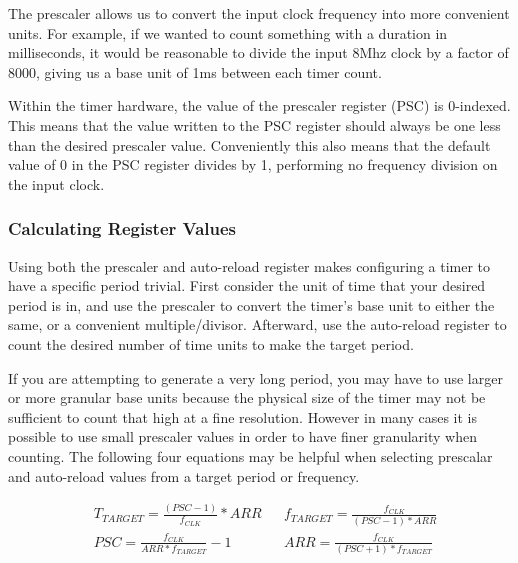 \documentclass[11pt,fleqn]{book} %
\begin{document}
        The prescaler allows us to convert the input clock frequency into more convenient units. For example, if we wanted to count something with a duration in milliseconds, it would be reasonable to divide the input 8Mhz clock by a factor of 8000, giving us a base unit of 1ms between each timer count. 
        
        Within the timer hardware, the value of the prescaler register (PSC) is 0-indexed. This means that the value written to the PSC register should always be one less than the desired prescaler value. Conveniently this also means that the default value of 0 in the PSC register divides by 1, performing no frequency division on the input clock. 

    \subsubsection{Calculating Register Values}
        Using both the prescaler and auto-reload register makes configuring a timer to have a specific period trivial. First consider the unit of time that your desired period is in, and use the prescaler to convert the timer's base unit to either the same, or a convenient multiple/divisor. Afterward, use the auto-reload register to count the desired number of time units to make the target period. 
        
        If you are attempting to generate a very long period, you may have to use larger or more granular base units because the physical size of the timer may not be sufficient to count that high at a fine resolution. However in many cases it is possible to use small prescaler values in order to have finer granularity when counting.
        The following four equations may be helpful when selecting prescalar and auto-reload values from a target period or frequency. 
        
        \begin{align*}
            & T_{TARGET} = \frac{(PSC-1)}{f_{CLK}} * ARR & & f_{TARGET} = \frac{f_{CLK}}{(PSC-1) * ARR}\\[1em]
            & PSC = \frac{f_{CLK}}{ARR * f_{TARGET}}-1 & & ARR = \frac{f_{CLK}}{(PSC+1) * f_{TARGET}}
        \end{align*}
        	
\end{document}
